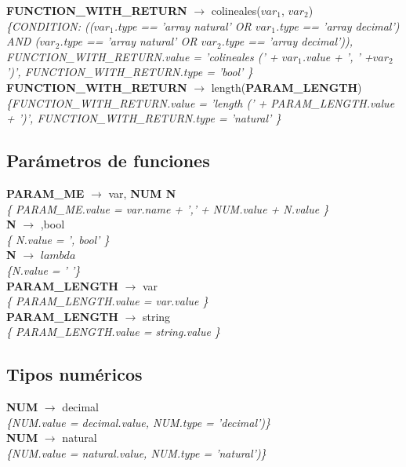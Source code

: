 \documentclass[10pt,a4paper]{article}
\begin{document}
\textbf{FUNCTION\_WITH\_RETURN} $\rightarrow$ colineales($var_{1}$, $var_{2}$)   \\
\textit{\{CONDITION: (($var_{1}$.type == 'array natural' OR $ var_{1}$.type == 'array decimal') AND
($var_{2}$.type == 'array natural' OR $var_{2}$.type == 'array decimal')), FUNCTION\_WITH\_RETURN.value =  'colineales (' + $var_{1}$.value + ', ' +$var_{2}$')', FUNCTION\_WITH\_RETURN.type = 'bool' \}} \\

\textbf{FUNCTION\_WITH\_RETURN} $\rightarrow$ length(\textbf{PARAM\_LENGTH}) \\
\textit{\{FUNCTION\_WITH\_RETURN.value =  'length (' + PARAM\_LENGTH.value + ')', FUNCTION\_WITH\_RETURN.type = 'natural' \}} \\

\subsection{Parámetros de funciones}
\textbf{PARAM\_ME} $\rightarrow$ var, \textbf{NUM N} \\
\textit{\{ PARAM\_ME.value = var.name + ',' + NUM.value + N.value    \}} \\

\textbf{N} $\rightarrow$ ,bool \\
\textit{\{ N.value = ', bool'   \}} \\ 

\textbf{N} $\rightarrow$ $lambda$  \\
\textit{\{N.value = ' '\}} \\

\textbf{PARAM\_LENGTH} $\rightarrow$ var \\
\textit{\{ PARAM\_LENGTH.value = var.value    \}} \\

\textbf{PARAM\_LENGTH} $\rightarrow$ string \\
\textit{\{ PARAM\_LENGTH.value = string.value   \}} \\

\subsection{Tipos numéricos}
\textbf{NUM} $\rightarrow$ decimal \\
\textit{\{NUM.value = decimal.value, NUM.type = 'decimal')\}}  \\ 

\textbf{NUM} $\rightarrow$ natural \\
\textit{\{NUM.value = natural.value, NUM.type = 'natural')\}}  \\ 
\end{document}
